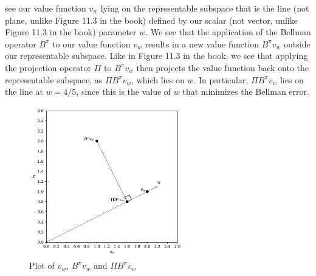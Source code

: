 \documentclass{article}
\begin{document}
\begin{enumerate}
	      see our value function $v_w$ lying on the representable subspace that is the line (not plane,
	      unlike Figure 11.3 in the book) defined by our scalar (not vector, unlike Figure 11.3 in the
	      book) parameter $w.$ We see that the application of the Bellman operator $B^\pi$ to our value
	      function $v_w$ results in a new value function $B^\pi v_w $ outside our representable subspace.
	      Like in Figure 11.3 in the book, we see that applying the projection operator $\Pi$ to $B^\pi
		      v_w$ then projects the value function back onto the representable subspace, as $\Pi B^\pi v_w$,
	      which lies on $w$. In particular, $\Pi B^\pi v_w$ lies on the line at $w = 4/5$, since this
	      is the value of $w$ that minimizes the Bellman error.
	      \begin{figure}[ht!]
		      \centering
		      \includegraphics[width=0.6\textwidth]{images/7.4.4.pdf}
		      \caption{Plot of $v_w$, $B^\pi v_w$ and $\Pi B^\pi v_w$}
		      \label{fig:7.4.4}
	      \end{figure}
\end{enumerate}
\end{document}
